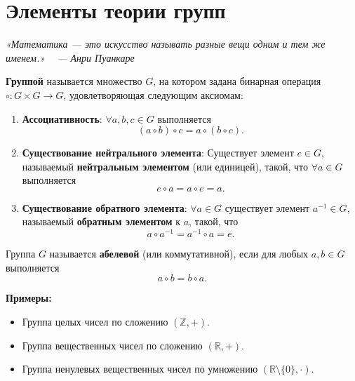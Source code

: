 \chapter{Элементы теории групп}

\begin{flushright}
\small
\itshape
«Математика — это искусство называть разные вещи одним и тем же именем.» \
\upshape
— Анри Пуанкаре
\end{flushright}

\begin{shdef}
    \begin{definition} [Группа]
    \leavevmode \nl

    \textbf{Группой} называется множество \( G \), на котором задана бинарная операция \( \circ : G \times G \to G \), удовлетворяющая следующим аксиомам:
\begin{enumerate}
    \item \textbf{Ассоциативность}: \(\forall a, b, c \in G \) выполняется
    \[
    (a \circ b) \circ c = a \circ (b \circ c).
    \]
    \item \textbf{Существование нейтрального элемента}: Существует элемент \( e \in G \), \\называемый \textbf{нейтральным элементом} (или единицей), такой, что \(\forall a \in G \) выполняется
    \[
    e \circ a = a \circ e = a.
    \]
    \item \textbf{Существование обратного элемента}: \(\forall a \in G \) существует элемент \( a^{-1} \in G \), называемый \textbf{обратным элементом} к \( a \), такой, что
    \[
    a \circ a^{-1} = a^{-1} \circ a = e.
    \]
    \end{enumerate}
    \end{definition}
\end{shdef}

\begin{shdef}
    \begin{definition} 
    \leavevmode \nl

    Группа \( G \) называется \textbf{абелевой} (или коммутативной), если для любых \( a, b \in G \) выполняется
    \[
    a \circ b = b \circ a.
    \]
    
    \textbf{Примеры:}
    \begin{itemize}
        \item Группа целых чисел по сложению \( (\mathbb{Z}, +) \).
        \item Группа вещественных чисел по сложению \( (\mathbb{R}, +) \).
        \item Группа ненулевых вещественных чисел по умножению \( (\mathbb{R} \setminus \{0\}, \cdot) \).
    \end{itemize}
    \end{definition}
\end{shdef}

